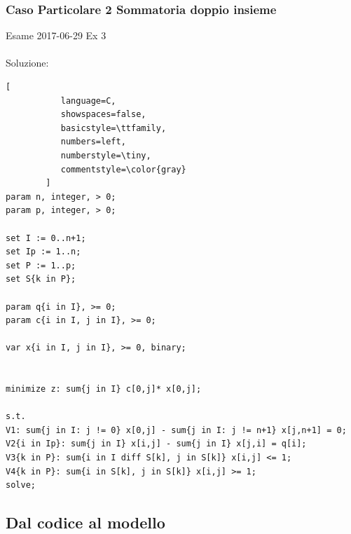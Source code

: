 \documentclass{article}
\begin{document}
\subsubsection{Caso Particolare 2 Sommatoria doppio insieme}
Esame 2017-06-29 Ex 3\\
\noindent{}%
\\
Soluzione:\\
\begin{lstlisting}[
           language=C,
           showspaces=false,
           basicstyle=\ttfamily,
           numbers=left,
           numberstyle=\tiny,
           commentstyle=\color{gray}
        ]
param n, integer, > 0;
param p, integer, > 0;

set I := 0..n+1;
set Ip := 1..n;
set P := 1..p;
set S{k in P};

param q{i in I}, >= 0;
param c{i in I, j in I}, >= 0;

var x{i in I, j in I}, >= 0, binary;


minimize z: sum{j in I} c[0,j]* x[0,j];

s.t.
V1: sum{j in I: j != 0} x[0,j] - sum{j in I: j != n+1} x[j,n+1] = 0;
V2{i in Ip}: sum{j in I} x[i,j] - sum{j in I} x[j,i] = q[i];
V3{k in P}: sum{i in I diff S[k], j in S[k]} x[i,j] <= 1;
V4{k in P}: sum{i in S[k], j in S[k]} x[i,j] >= 1;
solve;

\end{lstlisting}


\subsection{Dal codice al modello}
\end{document}
